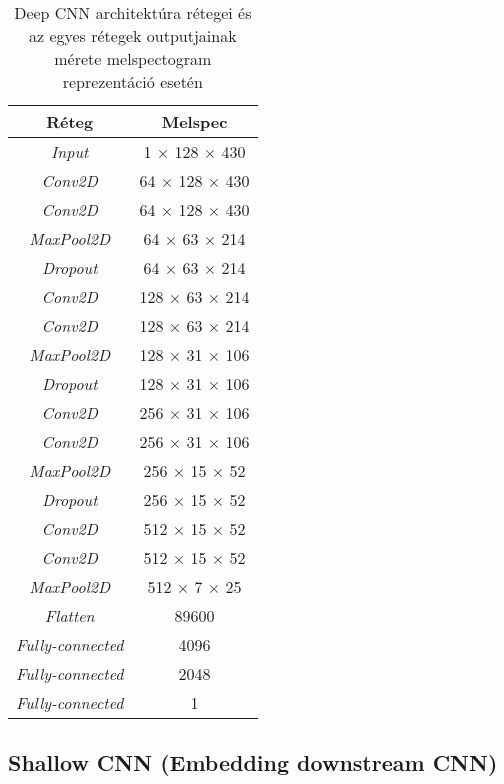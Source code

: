 \begin{table}[H]
	\centering
	\begin{tabular}{ | c | c |}
		\hline
		\textbf{Réteg} & \textbf{Melspec}  \\
		\hline \hline
		\emph{Input} & 1 $\times$ 128 $\times$ 430 \\
		\hline
		\emph{Conv2D} & 64 $\times$ 128 $\times$ 430 \\
		\hline
		\emph{Conv2D} & 64 $\times$ 128 $\times$ 430 \\
		\hline
		\emph{MaxPool2D} & 64 $\times$ 63 $\times$ 214 \\
		\hline
		\emph{Dropout} & 64 $\times$ 63 $\times$ 214 \\
		\hline 
		\emph{Conv2D} & 128 $\times$ 63 $\times$ 214 \\
		\hline
		\emph{Conv2D} & 128 $\times$ 63 $\times$ 214 \\
		\hline
		\emph{MaxPool2D} & 128 $\times$ 31 $\times$ 106 \\
		\hline
		\emph{Dropout} & 128 $\times$ 31 $\times$ 106 \\
		\hline 
		\emph{Conv2D} & 256 $\times$ 31 $\times$ 106 \\
		\hline
		\emph{Conv2D} & 256 $\times$ 31 $\times$ 106 \\
		\hline
		\emph{MaxPool2D} & 256 $\times$ 15 $\times$ 52 \\
		\hline
		\emph{Dropout} & 256 $\times$ 15 $\times$ 52 \\
		\hline 
		\emph{Conv2D} & 512 $\times$ 15 $\times$ 52 \\
		\hline
		\emph{Conv2D} & 512 $\times$ 15 $\times$ 52 \\
		\hline
		\emph{MaxPool2D} & 512 $\times$ 7 $\times$ 25 \\
		\hline
		\emph{Flatten} & 89600 \\
		\hline
		\emph{Fully-connected} & 4096 \\
		\hline
		\emph{Fully-connected} & 2048 \\
		\hline
		\emph{Fully-connected} & 1 \\
		\hline
	\end{tabular}
	\caption{Deep CNN architektúra rétegei és az egyes rétegek outputjainak mérete melspectogram reprezentáció esetén}
	\label{tab:dcnn}
\end{table}

\subsection{Shallow CNN (Embedding downstream CNN)}

